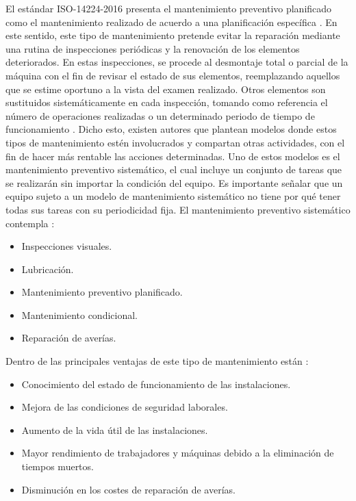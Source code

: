 El estándar ISO-14224-2016 presenta el mantenimiento preventivo planificado como el mantenimiento realizado de acuerdo a una planificación específica \parencite{iso2016}. En este sentido, este tipo de mantenimiento pretende evitar la reparación mediante una rutina de inspecciones periódicas y la renovación de los elementos deteriorados. En estas inspecciones, se procede al desmontaje total o parcial de la máquina con el fin de revisar el estado de sus elementos, reemplazando aquellos que se estime oportuno a la vista del examen realizado. Otros elementos son sustituidos sistemáticamente en cada inspección, tomando como referencia el número de operaciones realizadas o un determinado periodo de tiempo de funcionamiento \parencite{gomez1998}. Dicho esto, existen autores que plantean modelos donde estos tipos de mantenimiento estén involucrados y compartan otras actividades, con el fin de hacer más rentable las acciones determinadas. Uno de estos modelos es el mantenimiento preventivo sistemático, el cual incluye un conjunto de tareas que se realizarán sin importar la condición del equipo. Es importante señalar que un equipo sujeto a un modelo de mantenimiento sistemático no tiene por qué tener todas sus tareas con su periodicidad fija. El mantenimiento preventivo sistemático contempla \parencite{garcia2010}:

\begin{itemize}
\item Inspecciones visuales.
\item Lubricación.
\item Mantenimiento preventivo planificado.
\item Mantenimiento condicional.
\item Reparación de averías.
\end{itemize}

Dentro de las principales ventajas de este tipo de mantenimiento están \parencite{jimenez2015}:

\begin{itemize}
\item Conocimiento del estado de funcionamiento de las instalaciones.
\item Mejora de las condiciones de seguridad laborales.
\item Aumento de la vida útil de las instalaciones.
\item Mayor rendimiento de trabajadores y máquinas debido a la eliminación de tiempos muertos.
\item Disminución en los costes de reparación de averías.
\end{itemize}

